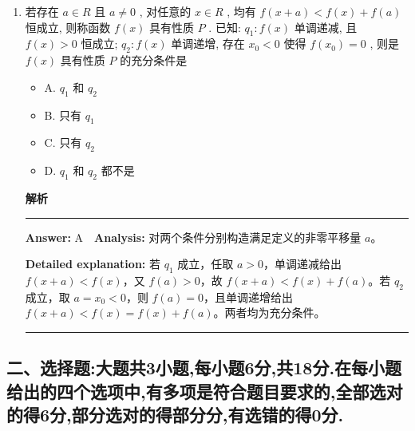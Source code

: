 \documentclass[UTF8,12pt,a4paper]{ctexart}
\newenvironment{examSolutionBox}{%
  \par\medskip\begingroup
  \setlength{\leftskip}{1.0em}\setlength{\rightskip}{0.9em}%
  \noindent\textcolor{SolutionTeal}{\bfseries\large 解析}\par
  \smallskip\noindent\textcolor{SolutionRule}{\rule{\dimexpr\linewidth-\leftskip-\rightskip\relax}{0.8pt}}\par
  \smallskip\color{SolutionInk}%
}{%
  \par\smallskip\noindent\textcolor{SolutionRule}{\rule{\dimexpr\linewidth-\leftskip-\rightskip\relax}{0.8pt}}\par
  \endgroup\medskip
}
\providecommand{\tightlist}{%
  \setlength{\itemsep}{0pt}\setlength{\parskip}{0pt}}
\begin{document}
\begin{enumerate}
\begin{examSolutionBox}
  \textbf{Detailed explanation:} 在椭圆上令 \(x^2=10(1-y^2)\)，则点 \(Q\) 到圆心 \(O_1(0,6)\) 的距离平方为
  \[
  O_1Q^2=x^2+(y-6)^2=46-9y^2-12y=50-9\left(y+\frac23\right)^2.
  \]
  当 \(y=-\dfrac23\) 时取最大值 \(50\)，故 \(\max O_1Q=5\sqrt2\)。对该 \(Q\)，圆上可取反向共线的 \(P\)，所以 \(\max PQ=5\sqrt2+\sqrt2=6\sqrt2\)。

  \textbf{Caution:} 按题面现有方程计算，结果不在 A--D 中；可能存在原题或 OCR 缺损，因此不强行改选项。

  \end{examSolutionBox}
\item
  若存在 \(a \in R\) 且 \(a \neq 0\) , 对任意的 \(x \in R\) , 均有 \(f(x + a) < f(x) + f(a)\) 恒成立, 则称函数 \(f(x)\) 具有性质 \(P\) . 已知: \(q_{1}: f(x)\) 单调递减, 且 \(f(x) > 0\) 恒成立; \(q_{2}: f(x)\) 单调递增, 存在 \(x_{0} < 0\) 使得 \(f(x_{0}) = 0\) , 则是 \(f(x)\) 具有性质 \(P\) 的充分条件是

  \begin{itemize}
  \tightlist
  \item
    A. \(q_{1}\) 和 \(q_{2}\)
  \item
    B. 只有 \(q_{1}\)
  \item
    C. 只有 \(q_{2}\)
  \item
    D. \(q_{1}\) 和 \(q_{2}\) 都不是
  \end{itemize}

  \begin{examSolutionBox}

  \textbf{Answer:} A　\textbf{Analysis:} 对两个条件分别构造满足定义的非零平移量 \(a\)。

  \textbf{Detailed explanation:} 若 \(q_1\) 成立，任取 \(a>0\)，单调递减给出 \(f(x+a)<f(x)\)，又 \(f(a)>0\)，故 \(f(x+a)<f(x)+f(a)\)。若 \(q_2\) 成立，取 \(a=x_0<0\)，则 \(f(a)=0\)，且单调递增给出 \(f(x+a)<f(x)=f(x)+f(a)\)。两者均为充分条件。

  \end{examSolutionBox}
\end{enumerate}

\subsection{二、选择题:大题共3小题,每小题6分,共18分.在每小题给出的四个选项中,有多项是符合题目要求的,全部选对的得6分,部分选对的得部分分,有选错的得0分.}\label{ux4e8cux9009ux62e9ux9898ux5927ux9898ux51713ux5c0fux9898ux6bcfux5c0fux98986ux5206ux517118ux5206.ux5728ux6bcfux5c0fux9898ux7ed9ux51faux7684ux56dbux4e2aux9009ux9879ux4e2dux6709ux591aux9879ux662fux7b26ux5408ux9898ux76eeux8981ux6c42ux7684ux5168ux90e8ux9009ux5bf9ux7684ux5f976ux5206ux90e8ux5206ux9009ux5bf9ux7684ux5f97ux90e8ux5206ux5206ux6709ux9009ux9519ux7684ux5f970ux5206.}
\end{document}
